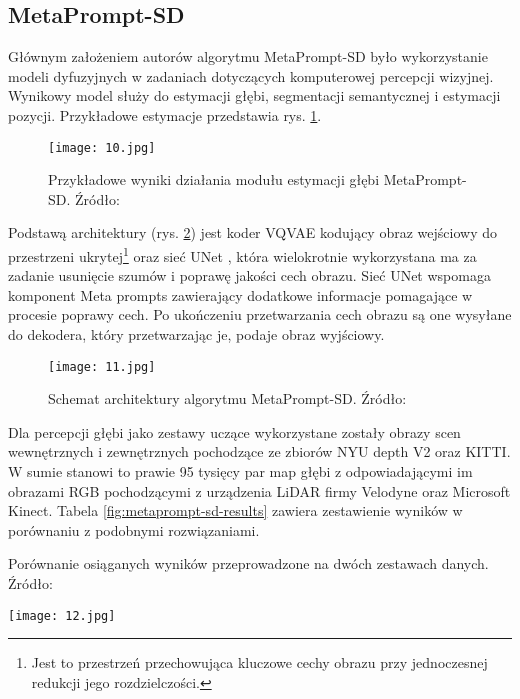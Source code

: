 \subsection{MetaPrompt-SD}
Głównym założeniem autorów algorytmu MetaPrompt-SD \cite{wan2023} było wykorzystanie modeli dyfuzyjnych w zadaniach dotyczących komputerowej percepcji wizyjnej. Wynikowy model służy do estymacji głębi, segmentacji semantycznej i estymacji pozycji. Przykładowe estymacje przedstawia rys. \ref{fig:metaprompt-sd}.
\begin{figure}[H]
    \centering
    \texttt{[image: 10.jpg]}
    \caption{Przykładowe wyniki działania modułu estymacji głębi MetaPrompt-SD. Źródło: \cite{wan2023}}
    \label{fig:metaprompt-sd}
\end{figure}
Podstawą architektury (rys. \ref{fig:metaprompt-sd-schema}) jest koder VQVAE \cite{oord2018} kodujący obraz wejściowy do przestrzeni ukrytej\footnote{Jest to przestrzeń przechowująca kluczowe cechy obrazu przy jednoczesnej redukcji jego rozdzielczości.} oraz sieć UNet \cite{ronneberger2015}, która wielokrotnie wykorzystana ma za zadanie usunięcie szumów i poprawę jakości cech obrazu. Sieć UNet wspomaga komponent Meta prompts zawierający dodatkowe informacje pomagające w procesie poprawy cech. Po ukończeniu przetwarzania cech obrazu są one wysyłane do dekodera, który przetwarzając je, podaje obraz wyjściowy.
\begin{figure}[H]
    \centering
    \texttt{[image: 11.jpg]}
    \caption{Schemat architektury algorytmu MetaPrompt-SD. Źródło: \cite{wan2023}}
    \label{fig:metaprompt-sd-schema}
\end{figure}
Dla percepcji głębi jako zestawy uczące wykorzystane zostały obrazy scen wewnętrznych i zewnętrznych pochodzące ze zbiorów NYU depth V2 oraz KITTI. W sumie stanowi to prawie 95 tysięcy par map głębi z odpowiadającymi im obrazami RGB pochodzącymi z urządzenia LiDAR firmy Velodyne oraz Microsoft Kinect. Tabela \ref{fig:metaprompt-sd-results} zawiera zestawienie wyników w porównaniu z podobnymi rozwiązaniami.
\begin{table}[H]
    \centering
    \caption{Porównanie osiąganych wyników przeprowadzone na dwóch zestawach danych. Źródło: \cite{wan2023}}
    \texttt{[image: 12.jpg]}
    \label{fig:metaprompt-sd-results}
\end{table}

